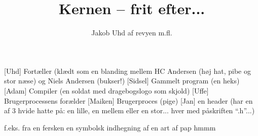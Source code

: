 \documentclass[danish]{article}
\title{Kernen -- frit efter...}
\author{Jakob Uhd af revyen m.fl.}
\begin{document}
\maketitle

\begin{roles}
  [Uhd] Fortæller (klædt som en blanding mellem HC Andersen (høj hat, pibe og stor næse) og Niels Andersen (bukser!)
  [Sidsel] Gammelt program (en heks)
  [Adam] Compiler (en soldat med dragebogslogo som skjold)
  [Uffe] Brugerprocessens forælder
  [Maiken] Brugerproces (pige)
  [Jan] en header (har en af 3 hvide hatte på: en lille, en mellem eller en stor... hver med påskriften ``.h''...) 
\end{roles}

\begin{props}
   f.eks. fra en fersken
   en symbolsk indhegning af en art
   af pap
   hmmm
\end{props}
\end{document}
